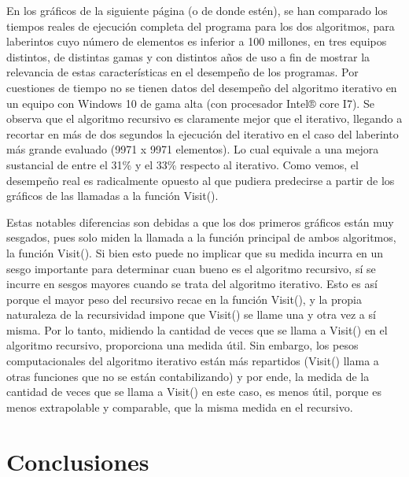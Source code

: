 \documentclass[12pt,a4paper]{article}
\begin{document}
En los gráficos de la siguiente página (o de donde estén), se han comparado los tiempos reales de ejecución completa del programa para los dos algoritmos, para laberintos cuyo número de elementos es inferior a 100 millones, en tres equipos distintos, de distintas gamas y con distintos años de uso a fin de mostrar la relevancia de estas características en el desempeño de los programas. Por cuestiones de tiempo no se tienen datos del desempeño del algoritmo iterativo en un equipo con Windows 10 de gama alta (con procesador Intel® core I7). Se observa que el algoritmo recursivo es claramente mejor que el iterativo, llegando a recortar en más de dos segundos la ejecución del iterativo en el caso del laberinto más grande evaluado (9971 x 9971 elementos). Lo cual equivale a una mejora sustancial de entre el 31\% y el 33\% respecto al iterativo. Como vemos, el desempeño real es radicalmente opuesto al que pudiera predecirse a partir de los gráficos de las llamadas a la función Visit(). 

Estas notables diferencias son debidas a que los dos primeros gráficos están muy sesgados, pues solo miden la llamada a la función principal de ambos algoritmos, la función Visit(). Si bien esto puede no implicar que su medida incurra en un sesgo importante para determinar cuan bueno es el algoritmo recursivo, sí se incurre en sesgos mayores cuando se trata del algoritmo iterativo. Esto es así porque el mayor peso del recursivo recae en la función Visit(), y la propia naturaleza de la recursividad impone que Visit() se llame una y otra vez a sí misma. Por lo tanto, midiendo la cantidad de veces que se llama a Visit() en el algoritmo recursivo, proporciona una medida útil. Sin embargo, los pesos computacionales del algoritmo iterativo están más repartidos (Visit() llama a otras funciones que no se están contabilizando) y por ende, la medida de la cantidad de veces que se llama a Visit() en este caso, es menos útil, porque es menos extrapolable y comparable, que la misma medida en el recursivo. 

\clearpage
\section{Conclusiones}

\clearpage


\end{document}

